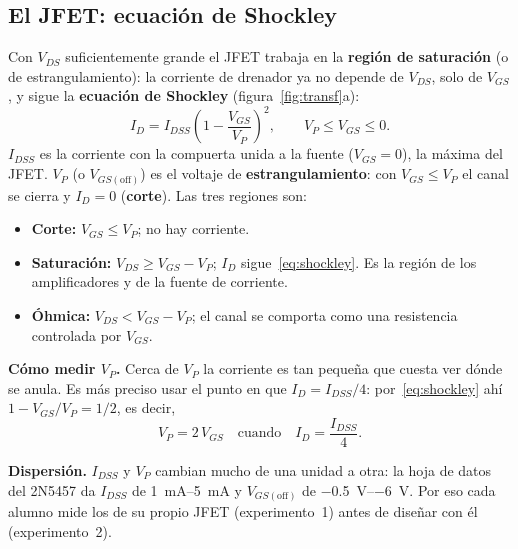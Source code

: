 \documentclass[11pt,a4paper]{article}
\begin{document}
\subsection{El JFET: ecuación de Shockley}
\label{sec:jfet}
Con $V_{DS}$ suficientemente grande el JFET trabaja en la \textbf{región de saturación}
(o de estrangulamiento): la corriente de drenador ya no depende de $V_{DS}$, solo de $V_{GS}$,
y sigue la \textbf{ecuación de Shockley} (figura~\ref{fig:transf}a):
\begin{equation}
  I_D = I_{DSS}\left(1 - \frac{V_{GS}}{V_P}\right)^{2},
  \qquad V_P \le V_{GS} \le 0.
  \label{eq:shockley}
\end{equation}
$I_{DSS}$ es la corriente con la compuerta unida a la fuente ($V_{GS} = 0$), la máxima del
JFET. $V_P$ (o $V_{GS(\text{off})}$) es el voltaje de \textbf{estrangulamiento}: con
$V_{GS} \le V_P$ el canal se cierra y $I_D = 0$ (\textbf{corte}). Las tres regiones son:
\begin{itemize}
  \item \textbf{Corte:} $V_{GS} \le V_P$; no hay corriente.
  \item \textbf{Saturación:} $V_{DS} \ge V_{GS} - V_P$; $I_D$ sigue~\eqref{eq:shockley}.
        Es la región de los amplificadores y de la fuente de corriente.
  \item \textbf{Óhmica:} $V_{DS} < V_{GS} - V_P$; el canal se comporta como una resistencia
        controlada por $V_{GS}$.
\end{itemize}

\noindent\textbf{Cómo medir $V_P$.} Cerca de $V_P$ la corriente es tan pequeña que cuesta
ver dónde se anula. Es más preciso usar el punto en que $I_D = I_{DSS}/4$: por~\eqref{eq:shockley}
ahí $1 - V_{GS}/V_P = 1/2$, es decir,
\begin{equation}
  V_P = 2\,V_{GS} \quad\text{cuando}\quad I_D = \frac{I_{DSS}}{4}.
  \label{eq:vp}
\end{equation}

\noindent\textbf{Dispersión.} $I_{DSS}$ y $V_P$ cambian mucho de una unidad a otra: la hoja de
datos del 2N5457 da $I_{DSS}$ de \qtyrange{1}{5}{\milli\ampere} y $V_{GS(\text{off})}$ de
\qtyrange{-0.5}{-6}{\volt}. Por eso cada alumno mide los de su propio JFET (experimento~1)
antes de diseñar con él (experimento~2).
\end{document}
